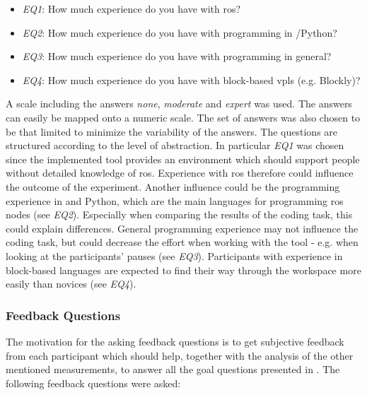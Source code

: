 \begin{itemize}
    \item \textit{EQ1}: How much experience do you have with \gls{ros}?
    \item \textit{EQ2}: How much experience do you have with programming in \Cpp{}/Python?
    \item \textit{EQ3}: How much experience do you have with programming in general?
    \item \textit{EQ4}: How much experience do you have with block-based \glspl{vpl} (e.g. Blockly)?
\end{itemize}
A scale including the answers \textit{none}, \textit{moderate} and \textit{expert} was used. The answers can easily be mapped onto a numeric scale. The set of answers was also chosen to be that limited to minimize the variability of the answers. The questions are structured according to the level of abstraction. In particular \textit{EQ1} was chosen since the implemented tool provides an environment which should support people without detailed knowledge of \gls{ros}. Experience with \gls{ros} therefore could influence the outcome of the experiment. Another influence could be the programming experience in \Cpp{} and Python, which are the main languages for programming \gls{ros} nodes (see \textit{EQ2}). Especially when comparing the results of the coding task, this could explain differences. General programming experience may not influence the coding task, but could decrease the effort when working with the tool - e.g. when looking at the participants' pauses (see \textit{EQ3}). Participants with experience in block-based languages are expected to find their way through the \toolname{} workspace more easily than novices (see \textit{EQ4}).

\subsubsection*{Feedback Questions}
The motivation for the asking feedback questions is to get subjective feedback from each participant which should help, together with the analysis of the other mentioned measurements, to answer all the goal questions presented in . The following feedback questions were asked:

